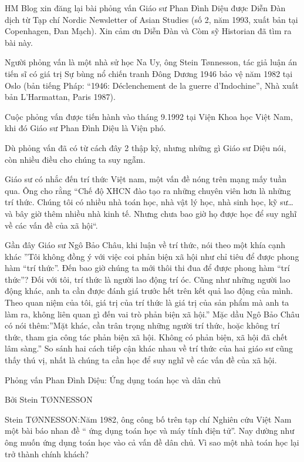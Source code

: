 \label{Stein}
HM Blog xin đăng lại bài phỏng vấn Giáo sư Phan Đình Diệu được Diễn Đàn dịch từ Tạp chí Nordic Newsletter of Asian Studies (số 2, năm 1993, xuất bản tại Copenhagen, Đan Mạch). Xin cảm ơn Diễn Đàn và Còm sỹ Historian đã tìm ra bài này.

Người phỏng vấn là một nhà sử học Na Uy, ông Stein Tønnesson, tác giả luận án tiến sĩ có giá trị Sự bùng nổ chiến tranh Đông Dương 1946 bảo vệ năm 1982 tại Oslo (bản tiếng Pháp: “1946: Déclenchement de la guerre d’Indochine”, Nhà xuất bản L’Harmattan, Paris 1987).

Cuộc phỏng vấn được tiến hành vào tháng 9.1992 tại Viện Khoa học Việt Nam, khi đó Giáo sư Phan Đình Diệu là Viện phó. 

Dù phỏng vấn đã có từ cách đây 2 thập kỷ, nhưng những gì Giáo sư Diệu nói, còn nhiều điều cho chúng ta suy ngẫm.

Giáo sư có nhắc đến trí thức Việt nam, một vấn đề nóng trên mạng mấy tuần qua. Ông cho rằng “Chế độ XHCN đào tạo ra những chuyên viên hơn là những trí thức. Chúng tôi có nhiều nhà toán học, nhà vật lý học, nhà sinh học, kỹ sư… và bây giờ thêm nhiều nhà kinh tế. Nhưng chưa bao giờ họ được học để suy nghĩ về các vấn đề của xã hội“.

Gần đây Giáo sư Ngô Bảo Châu, khi luận về trí thức, nói theo một khía cạnh khác ”Tôi không đồng ý với việc coi phản biện xã hội như chỉ tiêu để được phong hàm “trí thức”. Đến bao giờ chúng ta mới thôi thi đua để được phong hàm “trí thức”? Đối với tôi, trí thức là người lao động trí óc. Cũng như những người lao động khác, anh ta cần được đánh giá trước hết trên kết quả lao động của mình. Theo quan niệm của tôi, giá trị của trí thức là giá trị của sản phẩm mà anh ta làm ra, không liên quan gì đến vai trò phản biện xã hội.” Mặc dầu Ngô Bảo Châu có nói thêm:”Mặt khác, cần trân trọng những người trí thức, hoặc không trí thức, tham gia công tác phản biện xã hội. Không có phản biện, xã hội đã chết lâm sàng.” 
So sánh hai cách tiếp cận khác nhau về trí thức của hai giáo sư cũng thấy thú vị, nhất là chúng ta cần học để suy nghĩ về các vấn đề của xã hội. 

Phỏng vấn Phan Đình Diệu: Ứng dụng toán học và dân chủ

Bởi Stein TØNNESSON

Stein TØNNESSON:Năm 1982, ông công bố trên tạp chí Nghiên cứu Việt Nam một bài báo nhan đề “ ứng dụng toán học và máy tính điện tử”. Nay dường như ông muốn ứng dụng toán học vào cả vấn đề dân chủ. Vì sao một nhà toán học lại trở thành chính khách?

